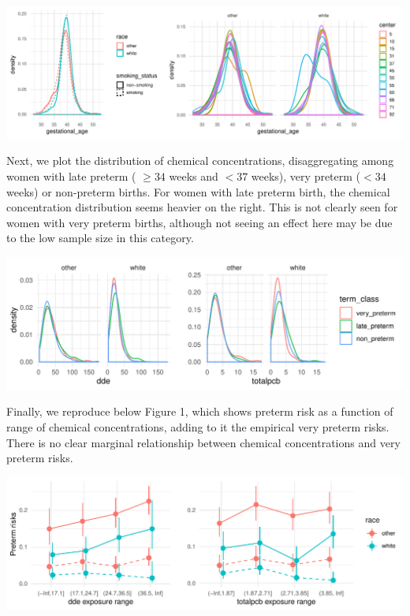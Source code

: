 \documentclass[10pt,]{article}
\begin{document}
\begin{center}\includegraphics{report_files/figure-latex/unnamed-chunk-5-1} \end{center}

Next, we plot the distribution of chemical concentrations,
disaggregating among women with late preterm ( \(\geq 34\) weeks and
\(< 37\) weeks), very preterm (\(< 34\) weeks) or non-preterm births.
For women with late preterm birth, the chemical concentration
distribution seems heavier on the right. This is not clearly seen for
women with very preterm births, although not seeing an effect here may
be due to the low sample size in this category.

\begin{center}\includegraphics{report_files/figure-latex/unnamed-chunk-6-1} \end{center}

Finally, we reproduce below Figure 1, which shows preterm risk as a
function of range of chemical concentrations, adding to it the empirical
very preterm risks. There is no clear marginal relationship between
chemical concentrations and very preterm risks.

\begin{center}\includegraphics{report_files/figure-latex/unnamed-chunk-7-1} \end{center}
\end{document}
